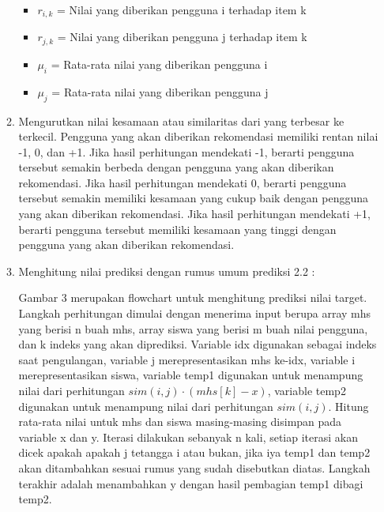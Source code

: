 \documentclass[a4paper,twoside]{article}
\begin{document}
\begin{enumerate}
\begin{enumerate}
\begin{itemize}
		\item $r_{i,k}$ = Nilai yang diberikan pengguna i terhadap item k
		
		\item $r_{j,k}$ = Nilai yang diberikan pengguna j terhadap item k
		
		\item $\mu_{i}$ = Rata-rata nilai yang diberikan pengguna i
		
		\item $\mu_{j}$ = Rata-rata nilai yang diberikan pengguna j
	\end{itemize}
	
	\item Mengurutkan nilai kesamaan atau similaritas dari yang terbesar ke terkecil. Pengguna yang akan diberikan rekomendasi memiliki rentan nilai -1, 0, dan +1. Jika hasil perhitungan mendekati -1, berarti pengguna tersebut semakin berbeda dengan pengguna yang akan diberikan rekomendasi. Jika hasil perhitungan mendekati 0, berarti pengguna tersebut semakin memiliki kesamaan yang cukup baik dengan pengguna yang akan diberikan rekomendasi. Jika hasil perhitungan mendekati +1, berarti pengguna tersebut memiliki kesamaan yang tinggi dengan pengguna yang akan diberikan rekomendasi.
	\item Menghitung nilai prediksi dengan rumus umum prediksi 2.2 :
	
	Gambar 3 merupakan flowchart untuk menghitung prediksi nilai target. Langkah perhitungan dimulai dengan menerima input berupa array mhs yang berisi n buah mhs, array siswa yang berisi m buah nilai pengguna, dan k indeks yang akan diprediksi. Variable idx digunakan sebagai indeks saat pengulangan, variable j merepresentasikan mhs ke-idx, variable i merepresentasikan siswa, variable temp1 digunakan untuk menampung nilai dari perhitungan $sim(i,j) \cdot (mhs[k]-x)$, variable temp2 digunakan untuk menampung nilai dari perhitungan $sim(i,j)$. Hitung rata-rata nilai untuk mhs dan siswa masing-masing disimpan pada variable x dan y. Iterasi dilakukan sebanyak n kali, setiap iterasi akan dicek apakah apakah j tetangga i atau bukan, jika iya temp1 dan temp2 akan ditambahkan sesuai rumus yang sudah disebutkan diatas. Langkah terakhir adalah menambahkan y dengan hasil pembagian temp1 dibagi temp2.
	

\end{enumerate}
\end{enumerate}
\end{document}
